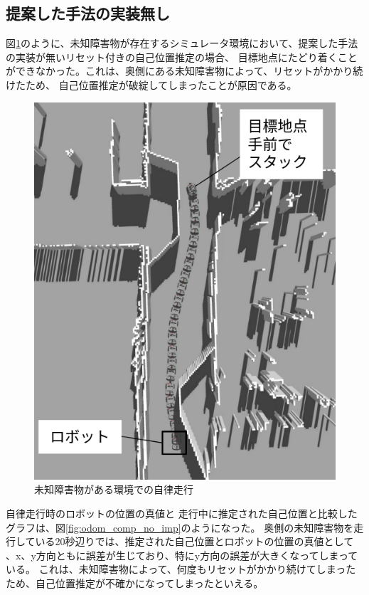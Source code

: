 \subsection{提案した手法の実装無し}

図\ref{fig:nav_no_imp}のように、未知障害物が存在するシミュレータ環境において、提案した手法の実装が無いリセット付きの自己位置推定の場合、
目標地点にたどり着くことができなかった。これは、奥側にある未知障害物によって、リセットがかかり続けたため、
自己位置推定が破綻してしまったことが原因である。

\begin{figure}[H]
  \begin{center}
    \includegraphics[width=0.5\linewidth]{figs/no_implementation_with_reset.png}
    \caption{未知障害物がある環境での自律走行}
    \label{fig:nav_no_imp}
  \end{center}
\end{figure}

自律走行時のロボットの位置の真値と
走行中に推定された自己位置と比較したグラフは、図\ref{fig:odom_comp_no_imp}のようになった。
奥側の未知障害物を走行している20秒辺りでは、推定された自己位置とロボットの位置の真値として
、x、y方向ともに誤差が生じており、特にy方向の誤差が大きくなってしまっている。
これは、未知障害物によって、何度もリセットがかかり続けてしまったため、自己位置推定が不確かになってしまったといえる。

